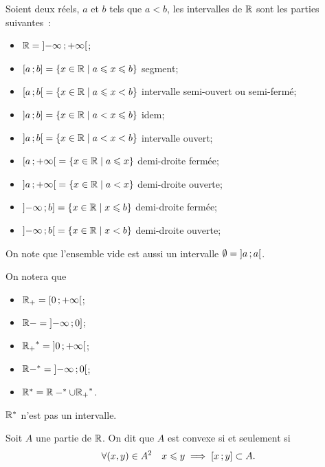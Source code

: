 \begin{defdef}
  Soient deux réels, \(a\) et \(b\) tels que \(a<b\), les intervalles de \(\mathbb{R}\) 
  sont les parties suivantes~:
  \begin{itemize}
    \item \(\mathbb{R}=\left] -\infty \, ;  +\infty \right[\);
    \item \(\left[ a \, ;  b \right]=\left\{x \in \mathbb{R}\mathrel{}\middle|\mathrel{}a\leqslant x \leqslant b\right\}\) 
      segment;
    \item \(\left[ a \, ;  b \right[=\left\{x \in \mathbb{R}\mathrel{}\middle|\mathrel{}a\leqslant x < b\right\}\) intervalle 
      semi-ouvert ou semi-fermé;
    \item \(\left] a \, ;  b \right]=\left\{x \in \mathbb{R}\mathrel{}\middle|\mathrel{}a< x \leqslant b\right\}\) idem;
    \item \(\left] a \, ;  b \right[=\left\{x \in \mathbb{R}\mathrel{}\middle|\mathrel{}a< x < b\right\}\) intervalle ouvert;
    \item \(\left[ a \, ;  +\infty \right[=\left\{x \in \mathbb{R}\mathrel{}\middle|\mathrel{}a\leqslant x\right\}\) 
      demi-droite fermée;
    \item \(\left] a \, ;  +\infty \right[=\left\{x \in \mathbb{R}\mathrel{}\middle|\mathrel{}a< x\right\}\) demi-droite 
      ouverte;
    \item \(\left] -\infty \, ;  b \right]=\left\{x \in \mathbb{R}\mathrel{}\middle|\mathrel{}x \leqslant b\right\}\) 
      demi-droite fermée;
    \item \(\left] -\infty \, ;  b \right[=\left\{x \in \mathbb{R}\mathrel{}\middle|\mathrel{}x <b\right\}\) demi-droite 
      ouverte;
  \end{itemize}
\end{defdef}
On note que l'ensemble vide est aussi un intervalle 
\(\emptyset=\left] a \, ;  a \right[\).
\begin{defdef}
  On notera que
  \begin{itemize}
    \item \(\mathbb{R}_{+}=\left[ 0 \, ;  +\infty \right[\);
    \item \(\mathbb{R}-=\left] -\infty \, ;  0 \right]\);
    \item \({\mathbb{R}_{+}}^*=\left] 0 \, ;  +\infty \right[\);
    \item \(\mathbb{R}-^*=\left] -\infty \, ;  0 \right[\);
    \item \(\mathbb{R}^*=\mathbb{R}-^* \cup {\mathbb{R}_{+}}^*\).
  \end{itemize}
  \(\mathbb{R}^*\) n'est pas un intervalle.
\end{defdef}
\begin{defdef}
  Soit \(A\) une partie de \(\mathbb{R}\). On dit que \(A\) est convexe si et seulement 
  si
  \begin{equation}
    \forall (x,y) \in A^2 \quad x\leqslant y \implies \left[ x \, ;  y \right]\subset 
    A.
  \end{equation}
\end{defdef}
